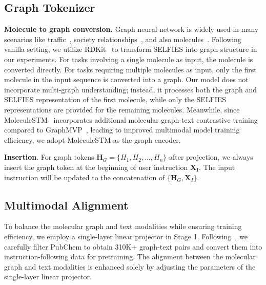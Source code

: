 \subsection{Graph Tokenizer}
\noindent\textbf{Molecule to graph conversion.} Graph neural network is widely used in many scenarios like traffic~\cite{zhang2025efficient}, society relationships~\cite{zhang2024graph}, and also molecules~\cite{sun2022does,sun2024graph}. Following vanilla setting, we utilize RDKit~\cite{landrum2013rdkit} to transform SELFIES into graph structure in our experiments. For tasks involving a single molecule as input, the molecule is converted directly. For tasks requiring multiple molecules as input, only the first molecule in the input sequence is converted into a graph. Our model does not incorporate multi-graph understanding; instead, it processes both the graph and SELFIES representation of the first molecule, while only the SELFIES representations are provided for the remaining molecules. Meanwhile, since MoleculeSTM~\cite{liu2023multi} incorporates additional molecular graph-text contrastive training compared to GraphMVP~\cite{liupre}, leading to improved multimodal model training efficiency, we adopt MoleculeSTM as the graph encoder.

\noindent\textbf{Insertion}. For graph tokens $\mathbf{H}_G=\{H_1, H_2,\dots,H_n\}$ after projection, we always insert the graph token at the beginning of user instruction $\mathbf{X_I}$. The input instruction will be updated to the concatenation of $\{\mathbf{H}_G, \mathbf{X}_I\}$.

\subsection{Multimodal Alignment}
To balance the molecular graph and text modalities while ensuring training efficiency, we employ a single-layer linear projector in Stage 1. Following~\citet{liu2023multi}, we carefully filter PubChem to obtain 310K+ graph-text pairs and convert them into instruction-following data for pretraining. The alignment between the molecular graph and text modalities is enhanced solely by adjusting the parameters of the single-layer linear projector.

